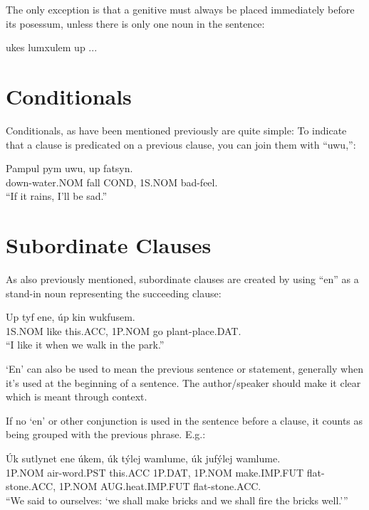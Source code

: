 \documentclass{book}
\begin{document}
The only exception is that a genitive must always be placed immediately before its posessum, unless there
is only one noun in the sentence:

\begin{center}
    \begin{exe}
        \ex ukes lumxulem up ...
    \end{exe}
\end{center}


\section{Conditionals}
Conditionals, as have been mentioned previously are quite simple:
To indicate that a clause is predicated on a previous clause, you
can join them with ``uwu,'':

\begin{exe}
    \ex
    \gll Pampul pym uwu, up fatsyn.\\
    down-water.NOM fall COND, 1S.NOM bad-feel. \\
    \glt ``If it rains, I'll be sad.''
\end{exe}


\section{Subordinate Clauses}
As also previously mentioned, subordinate clauses are created by
using ``en'' as a stand-in noun representing the succeeding clause:

\begin{exe}
    \ex
    \gll Up tyf ene, úp kin wukfusem.\\
    1S.NOM like this.ACC, 1P.NOM go plant-place.DAT. \\
    \glt ``I like it when we walk in the park.''
\end{exe}

`En' can also be used to mean the previous sentence or statement, generally when it's 
used at the beginning of a sentence. The author/speaker should make it clear which is
meant through context.

If no `en' or other conjunction is used in the sentence before a clause,
it counts as being grouped with the previous phrase.
E.g.:

\begin{exe}
    \ex
    \gll Úk sutlynet ene úkem, úk týlej wamlume, úk jufýlej wamlume.\\
    1P.NOM air-word.PST this.ACC 1P.DAT, 1P.NOM make.IMP.FUT flat-stone.ACC, 1P.NOM AUG.heat.IMP.FUT flat-stone.ACC. \\
    \glt ``We said to ourselves: `we shall make bricks and we shall fire the bricks well.'''
\end{exe}
\end{document}
